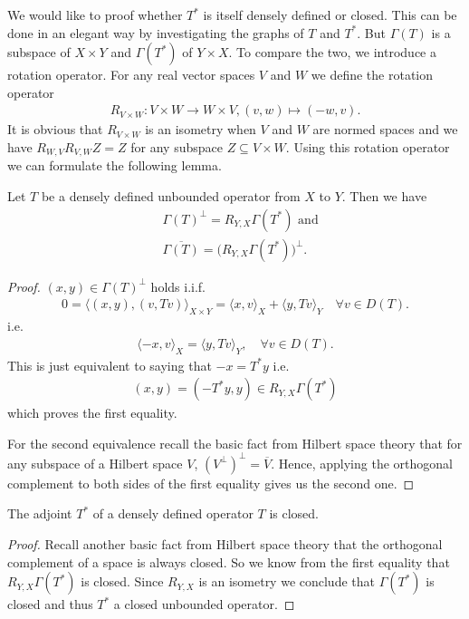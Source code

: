 \documentclass[../master_thesis.tex]{subfiles}
\begin{document}
We would like to proof whether $T^*$ is itself densely defined or closed. 
This can be done in an elegant way by investigating the graphs of $T$ and 
$T^*$. But $\Gamma(T)$ is a subspace of $X\times Y$ and 
$\Gamma(T^*)$ of $Y\times X$. To compare the two, we introduce a rotation operator. 
For any real vector spaces $V$ and $W$ we define the rotation operator 
\begin{align*}
    R_{V\times W}: V\times W \rightarrow W \times V, (v,w) \mapsto (-w,v).
\end{align*}
It is obvious that $R_{V\times W}$ is an isometry when $V$ and $W$ are normed spaces  
and we have $R_{W,V}R_{V,W}Z = Z$ for any subspace $Z\subseteq V\times W$.
Using this rotation operator we can formulate the following lemma.
\begin{lemma}\label{lem:rotated_graph}
    Let $T$ be a densely defined unbounded operator from $X$ to $Y$. 
    Then we have 
    \begin{align*}
        & \Gamma(T)^\perp = R_{Y,X}\Gamma(T^*) \text{ and}
        \\ &\overline{\Gamma(T)} = \big(R_{Y,X}\Gamma(T^*)\big)^\perp.
    \end{align*}
\end{lemma}
\begin{proof}
    $(x,y) \in \Gamma(T)^\perp$ holds i.i.f. 
    \begin{align*}
        0 = \langle (x,y), (v,Tv) \rangle _{X\times Y}
        = \langle x, v \rangle _X + \langle y, Tv \rangle _Y
            \quad \forall v \in D(T).
    \end{align*}
    i.e. 
    \begin{align*}
        \langle -x, v \rangle _X = \langle y, Tv \rangle _Y,
            \quad \forall v \in D(T).
    \end{align*}
    This is just equivalent to saying that $-x = T^*y$ i.e.
    \begin{align*}
        (x,y) = (-T^*y,y) \in R_{Y,X}\Gamma(T^*)
    \end{align*}
    which proves the first equality.

    For the second equivalence recall the basic fact from Hilbert space theory
    that for any subspace of a Hilbert space $V$,
    $(V^\perp)^\perp = \overline{V}$. Hence, applying the orthogonal 
    complement to both sides of the first equality gives us the second one.
\end{proof}

\begin{corollary}\label{cor:adjoint_of_densely_defined}
    The adjoint $T^*$ of a densely defined operator $T$ is closed. 
\end{corollary}
\begin{proof}
    Recall another basic fact from Hilbert space theory that the 
    orthogonal complement of a space is always closed. 
    So we know from the first equality that $R_{Y,X}\Gamma(T^*)$ is closed.
    Since $R_{Y,X}$ is an isometry we conclude that $\Gamma(T^*)$ is closed and 
    thus $T^*$ a closed unbounded operator.
\end{proof}
\end{document}
